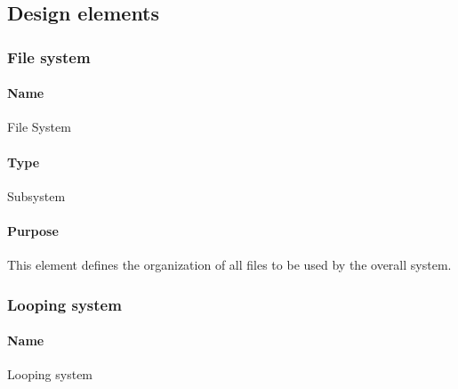 \subsection{Design elements}
    
    
    
    \subsubsection{File system}
        \paragraph{Name}    File System
        \paragraph{Type}    Subsystem
        \paragraph{Purpose} This element defines the organization of all files to be used by the overall system.

    \subsubsection{Looping system}
        \paragraph{Name}    Looping system
